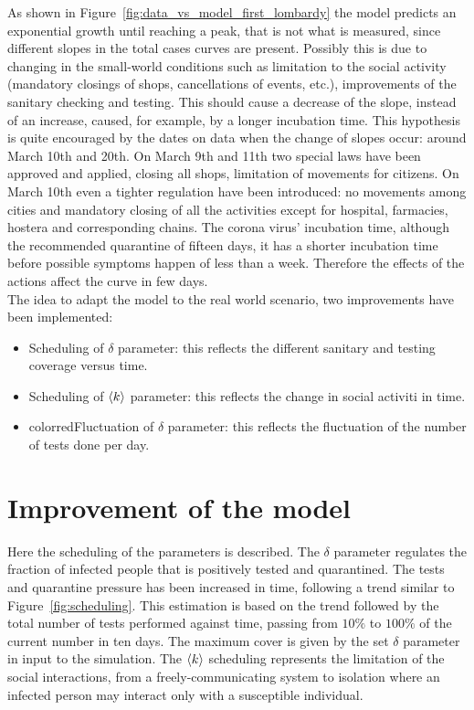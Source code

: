 As shown in Figure~\ref{fig:data_vs_model_first_lombardy} the model predicts an exponential growth until reaching a peak, that is not what is measured, since different slopes in the total cases curves are present. Possibly this is due to changing in the small-world conditions such as limitation to the social activity (mandatory closings of shops, cancellations of events, etc.), improvements of the sanitary checking and testing. This should cause a decrease of the slope, instead of an increase, caused, for example, by a longer incubation time. This hypothesis is quite encouraged by the dates on data when the change of slopes occur: around March 10th and 20th. On March 9th and 11th two special laws have been approved and applied, closing all shops, limitation of movements for citizens. On March 10th even a tighter regulation have been introduced: no movements among cities and mandatory closing of all the activities except for hospital, farmacies, hostera and corresponding chains. The corona virus' incubation time, although the recommended quarantine of fifteen days, it has a shorter incubation time before possible symptoms happen of less than a week. Therefore the effects of the actions affect the curve in few days.\\

The idea to adapt the model to the real world scenario, two improvements have been implemented:
\begin{itemize}
\item Scheduling of $\delta$ parameter: this reflects the different sanitary and testing coverage versus time.
\item Scheduling of $\braket{k}$ parameter: this reflects the change in social activiti in time.
\item {color{red}Fluctuation of $\delta$ parameter: this reflects the fluctuation of the number of tests done per day.}
\end{itemize}


\section{Improvement of the model}
Here the scheduling of the parameters is described. The $\delta$ parameter regulates the fraction of infected people that is positively tested and quarantined. The tests and quarantine pressure has been increased in time, following a trend similar to Figure~\ref{fig:scheduling}. This estimation is based on the trend followed by the total number of tests performed against time, passing from $10\%$ to $100\%$ of the current number in ten days. The maximum cover is given by the set $\delta$ parameter in input to the simulation. The $\braket{k}$ scheduling represents the limitation of the social interactions, from a freely-communicating system to isolation where an infected person may interact only with a susceptible individual.

